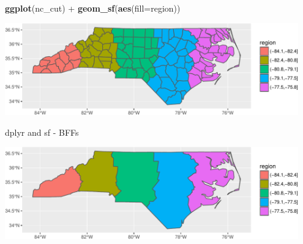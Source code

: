 \documentclass[11pt,ignorenonframetext,]{beamer}
\newenvironment{Shaded}{}{}
\newcommand{\KeywordTok}[1]{\textcolor[rgb]{0.00,0.44,0.13}{\textbf{#1}}}
\newcommand{\DataTypeTok}[1]{\textcolor[rgb]{0.56,0.13,0.00}{#1}}
\newcommand{\StringTok}[1]{\textcolor[rgb]{0.25,0.44,0.63}{#1}}
\newcommand{\OperatorTok}[1]{\textcolor[rgb]{0.40,0.40,0.40}{#1}}
\newcommand{\NormalTok}[1]{#1}
\let\oldShaded\Shaded
\let\endoldShaded\endShaded
\renewenvironment{Shaded}{\footnotesize\begin{spacing}{0.9}\oldShaded}{\endoldShaded\end{spacing}}
\let\oldverbatim\verbatim
\let\endoldverbatim\endverbatim
\newcommand{\scriptoutput}{
  \renewenvironment{Shaded}{\scriptsize\begin{spacing}{0.9}\oldShaded}{\endoldShaded\end{spacing}}
  \renewenvironment{verbatim}{\scriptsize\begin{spacing}{0.9}\oldverbatim}{\endoldverbatim\end{spacing}}
}
\begin{document}
\begin{frame}[fragile,t]{}

\scriptoutput

\begin{Shaded}
\begin{Highlighting}[]
\KeywordTok{ggplot}\NormalTok{(nc_cut) }\OperatorTok{+}
\StringTok{  }\KeywordTok{geom_sf}\NormalTok{(}\KeywordTok{aes}\NormalTok{(}\DataTypeTok{fill=}\NormalTok{region))}
\end{Highlighting}
\end{Shaded}

\begin{center}\includegraphics[width=0.95\textwidth]{Lec17_files/figure-beamer/unnamed-chunk-22-1} \end{center}

\end{frame}

\begin{frame}[fragile,t]{dplyr and sf - BFFs}

\scriptoutput

\begin{Shaded}
\end{Shaded}

\begin{center}\includegraphics[width=0.95\textwidth]{Lec17_files/figure-beamer/unnamed-chunk-23-1} \end{center}

\end{frame}
\end{document}
